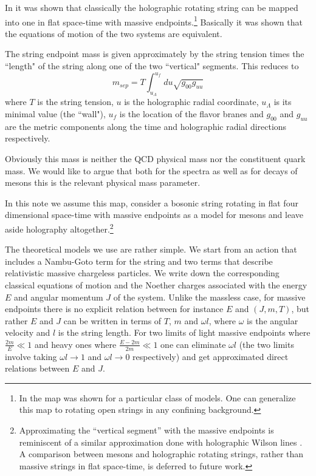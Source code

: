 \documentclass[11pt,a4]{article}
\def\be{\begin{equation}}
\def\ee{\end{equation}}
\begin{document}
In \cite{Kruczenski:2004me} it was shown that classically the holographic rotating string can be mapped into one in flat space-time with massive endpoints.\footnote{In \cite{Kruczenski:2004me} the map was shown for a particular class of models. One can generalize this map to rotating open strings in any confining background\cite{cobitalks}.} Basically it was shown that the equations of motion of the two systems are equivalent.


The string endpoint mass is given approximately by the string tension times the ``length" of the string along one of the two ``vertical" segments. This reduces to\cite{Kruczenski:2004me}
 \be
 m_{sep}= T\int_{u_\Lambda}^{u_f}du\sqrt{g_{00}g_{uu}}
 \ee
   where $T$ is the string tension, $u$ is the holographic radial coordinate, $u_\Lambda$ is its minimal value (the ``wall"), $u_f$ is the location of the flavor branes and $g_{00}$ and $g_{uu}$ are the metric components along the time and holographic radial directions respectively.


   Obviously this mass is neither the QCD physical mass nor the constituent quark mass. We would like to argue that both for the spectra as well as for decays\cite{Peeters:2005fq} of mesons this is the relevant physical mass parameter.


In this note we assume this map, consider a bosonic string rotating in flat four dimensional space-time with massive endpoints as a model for mesons and leave aside holography altogether.\footnote{Approximating the ``vertical segment'' with the massive endpoints is reminiscent of a similar approximation done with holographic Wilson lines \cite{oai:arXiv.org:hep-th/9911123}. A comparison between mesons and holographic rotating strings, rather than massive strings in flat space-time, is deferred to future work.}


The theoretical models we use are rather simple. We start from an action that includes a Nambu-Goto term for the string and two terms that describe relativistic massive chargeless particles. We write down the corresponding classical equations of motion and the Noether charges associated with the energy $E$ and angular momentum  $J$ of the system. Unlike the massless case, for massive endpoints there is no explicit relation between for instance $E$ and $(J,m,T)$, but rather $E$ and $J$ can be written in terms of $T$, $m$ and $\omega l$, where $\omega $ is the angular velocity and $l$ is the string length. For two limits of light massive endpoints where $\frac{2m}{E} \ll 1$ and heavy ones where $\frac{E-2m}{2m}\ll 1$ one can eliminate $\omega l$ (the two limits involve taking \(\omega l \rightarrow 1\) and \(\omega l \rightarrow 0\) respectively) and get approximated direct relations between $E$ and $J$.
\end{document}
